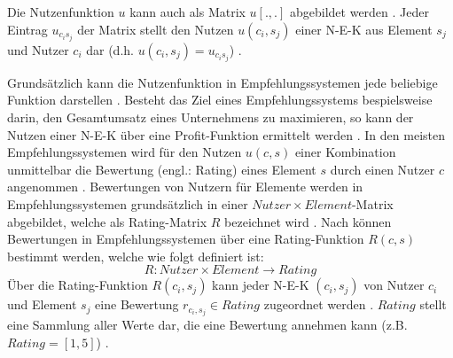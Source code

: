 Die Nutzenfunktion $u$ kann auch als Matrix $u[.,.]$ abgebildet werden \cite[S. 1]{dekhtyar:misc}.
Jeder Eintrag $u_{c_{i}s_{j}}$ der Matrix stellt den Nutzen $u(c_{i},s_{j})$ einer \ac{N-E-K} aus Element $s_{j}$ und Nutzer $c_{i}$ dar (d.h. $u(c_{i},s_{j}) = u_{c_{i}s_{j}}$) \cite[S. 1]{dekhtyar:misc}.

Grundsätzlich kann die Nutzenfunktion in Empfehlungssystemen jede beliebige Funktion darstellen \cite[S. 735]{adomavicius:inproceedings}.
Besteht das Ziel eines Empfehlungssystems bespielsweise darin, den Gesamtumsatz eines Unternehmens zu maximieren, so kann der Nutzen einer \ac{N-E-K} über eine Profit-Funktion ermittelt werden \cite[S. 735]{adomavicius:inproceedings}\cite[S. 11]{recommenderSystems:2016}\cite[S. 1]{jannach:article}\cite[S. 896]{adomavicius:article}.
In den meisten Empfehlungssystemen wird für den Nutzen $u(c,s)$ einer Kombination unmittelbar die Bewertung (engl.: Rating) eines Element $s$ durch einen Nutzer $c$ angenommen \cite[S. 735]{adomavicius:inproceedings}\cite[S. 9]{ricci:inbook}\cite[S. 11]{recommenderSystems:2016}\cite[S. 1]{dekhtyar:misc}\cite[S. 3880]{nilashi:article}.
Bewertungen von Nutzern für Elemente werden in Empfehlungssystemen grundsätzlich in einer $Nutzer \times Element$-Matrix abgebildet, welche als Rating-Matrix $R$ bezeichnet wird \cite[S. 87]{ekstrand:article}.
Nach \textcite[S. 48f.]{adomavicius:inproceedings:2} können Bewertungen in Empfehlungssystemen über eine Rating-Funktion $R(c,s)$ bestimmt werden, welche wie folgt definiert ist:
\begin{equation}\label{eq10}
    R: Nutzer \times Element \rightarrow Rating
\end{equation}
Über die Rating-Funktion $R(c_{i},s_{j})$ kann jeder \ac{N-E-K} $(c_{i},s_{j})$ von Nutzer $c_{i}$ und Element $s_{j}$ eine Bewertung $r_{c_{i},s_{j}} \in Rating$ zugeordnet werden \cite[S. 42]{ning:inbook}.
$Rating$ stellt eine Sammlung aller Werte dar, die eine Bewertung annehmen kann (z.B. $Rating = [1,5]$) \cite[S. 41]{ning:inbook}.

